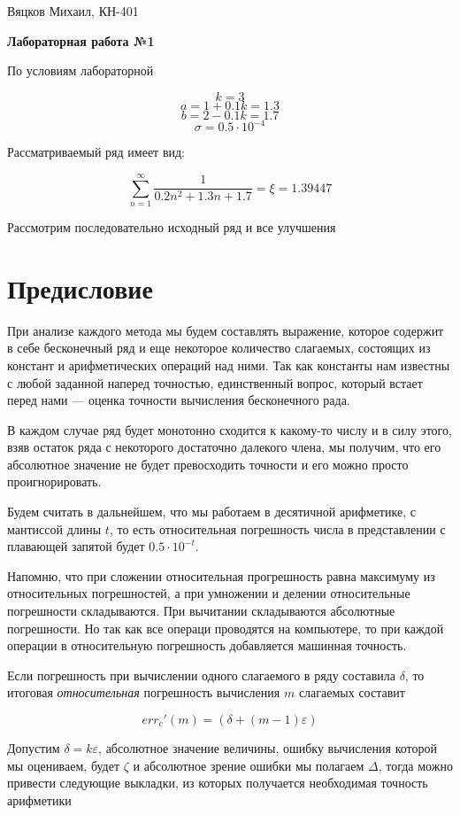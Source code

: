 \documentclass[11pt,a4paper,oneside]{article}
\begin{document}
\begin{center}
	{Вяцков Михаил, КН-401}
	
	{\huge \bf Лабораторная работа №1}
\end{center}

По условиям лабораторной

$$ k = 3 $$
$$ a = 1 + 0.1 k = 1.3 $$
$$ b = 2 - 0.1 k = 1.7 $$
$$ \sigma = 0.5 \cdot 10^{-4} $$

Рассматриваемый ряд имеет вид:

$$ \sum_{n = 1}^{\infty} \frac{1}{0.2n^2 + 1.3n + 1.7} = \xi = 1.39447 $$

Рассмотрим последовательно исходный ряд и все улучшения

\section{Предисловие}

При анализе каждого метода мы будем составлять выражение, которое содержит в себе бесконечный ряд и еще некоторое количество слагаемых, состоящих из констант и арифметических операций над ними. Так как константы нам известны с любой заданной наперед точностью, единственный вопрос, который встает перед нами --- оценка точности вычисления бесконечного рада.

В каждом случае ряд будет монотонно сходится к какому-то числу и в силу этого, взяв остаток ряда с некоторого достаточно далекого члена, мы получим, что его абсолютное значение не будет превосходить точности и его можно просто проигнорировать.

Будем считать в дальнейшем, что мы работаем в десятичной арифметике, с мантиссой длины $t$, то есть относительная погрешность числа в представлении с плавающей запятой будет $0.5 \cdot 10^{-t}$.

Напомню, что при сложении относительная прогрешность равна максимуму из относительных погрешностей, а при умножении и делении относительные погрешности складываются. При вычитании складываются абсолютные погрешности. Но так как все операци проводятся на компьютере, то при каждой операции в относительную погрешность добавляется машинная точность.

Если погрешность при вычислении одного слагаемого в ряду составила $\delta$, то итоговая \textit{относительная} погрешность вычисления $m$ слагаемых составит

$$ err_{c}'(m) = (\delta + (m - 1) \varepsilon) $$

Допустим $\delta = k \varepsilon$, абсолютное значение величины, ошибку вычисления которой мы оцениваем, будет $\zeta$ и абсолютное зрение ошибки мы полагаем $\varDelta$, тогда можно привести следующие выкладки, из которых получается необходимая точность арифметики
\end{document}
